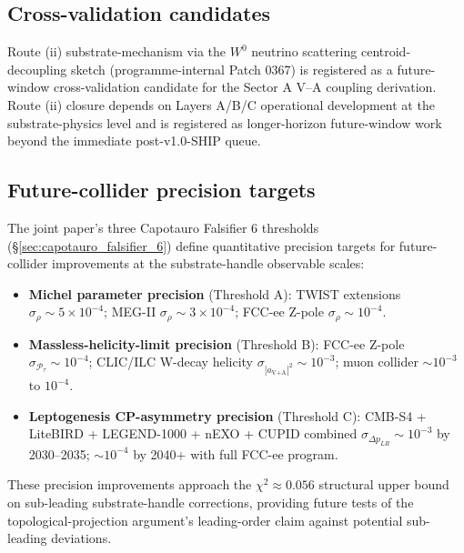 \documentclass[11pt,letterpaper]{article}
\newcommand{\DeltapLR}{\Delta p_{LR}}
\begin{document}
\subsection{Cross-validation candidates}
\label{sec:cross_validation_candidates}

Route (ii) substrate-mechanism via the $W^0$ neutrino scattering centroid-decoupling sketch (programme-internal Patch 0367) is registered as a future-window cross-validation candidate for the Sector A V--A coupling derivation. Route (ii) closure depends on Layers A/B/C operational development at the substrate-physics level and is registered as longer-horizon future-window work beyond the immediate post-v1.0-SHIP queue.

\subsection{Future-collider precision targets}
\label{sec:future_collider}

The joint paper's three Capotauro Falsifier 6 thresholds (§\ref{sec:capotauro_falsifier_6}) define quantitative precision targets for future-collider improvements at the substrate-handle observable scales:

\begin{itemize}[leftmargin=*]
\item \textbf{Michel parameter precision} (Threshold A): TWIST extensions $\sigma_\rho \sim 5 \times 10^{-4}$; MEG-II $\sigma_\rho \sim 3 \times 10^{-4}$; FCC-ee Z-pole $\sigma_\rho \sim 10^{-4}$.
\item \textbf{Massless-helicity-limit precision} (Threshold B): FCC-ee Z-pole $\sigma_{\mathcal{P}_\tau} \sim 10^{-4}$; CLIC/ILC W-decay helicity $\sigma_{|a_{\text{V+A}}|^2} \sim 10^{-3}$; muon collider $\sim 10^{-3}$ to $10^{-4}$.
\item \textbf{Leptogenesis CP-asymmetry precision} (Threshold C): CMB-S4 + LiteBIRD + LEGEND-1000 + nEXO + CUPID combined $\sigma_{\DeltapLR} \sim 10^{-3}$ by 2030--2035; $\sim 10^{-4}$ by 2040+ with full FCC-ee program.
\end{itemize}

These precision improvements approach the $\chi^2 \approx 0.056$ structural upper bound on sub-leading substrate-handle corrections, providing future tests of the topological-projection argument's leading-order claim against potential sub-leading deviations.

\end{document}
